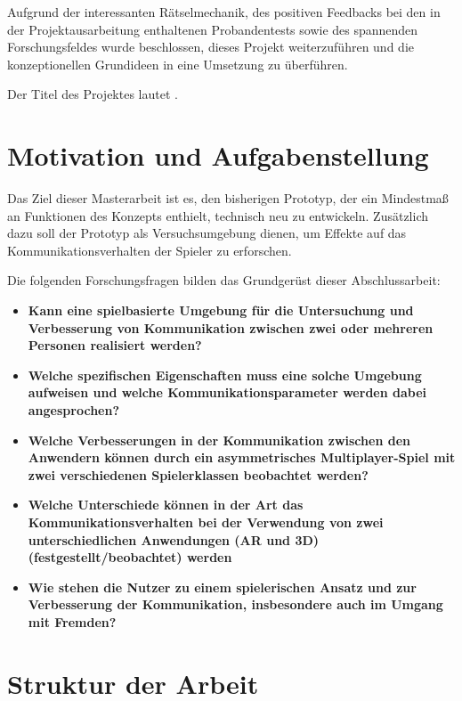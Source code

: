 Aufgrund der interessanten Rätselmechanik, des positiven Feedbacks bei den in der Projektausarbeitung enthaltenen Probandentests sowie des spannenden Forschungsfeldes wurde beschlossen, dieses Projekt weiterzuführen und die konzeptionellen Grundideen in eine Umsetzung zu überführen.

Der Titel des Projektes lautet .

\section{Motivation und Aufgabenstellung}
Das Ziel dieser Masterarbeit ist es, den bisherigen Prototyp, der ein Mindestmaß an Funktionen des Konzepts enthielt, technisch neu zu entwickeln. Zusätzlich dazu soll der Prototyp als Versuchsumgebung dienen, um Effekte auf das Kommunikationsverhalten der Spieler zu erforschen. 

Die folgenden Forschungsfragen bilden das Grundgerüst dieser Abschlussarbeit:


\begin{itemize}
    \item \textbf{Kann eine spielbasierte Umgebung für die Untersuchung und Verbesserung von Kommunikation zwischen zwei oder mehreren Personen realisiert werden?}
    \item \textbf{Welche spezifischen Eigenschaften muss eine solche Umgebung aufweisen und welche Kommunikationsparameter werden dabei angesprochen?}
    \item \textbf{Welche Verbesserungen in der Kommunikation zwischen den Anwendern können durch ein asymmetrisches Multiplayer-Spiel mit zwei verschiedenen Spielerklassen beobachtet werden?}
    \item \textbf{Welche Unterschiede können in der Art das Kommunikationsverhalten bei der Verwendung von zwei unterschiedlichen Anwendungen (AR und 3D) (festgestellt/beobachtet) werden}
    \item \textbf{Wie stehen die Nutzer zu einem spielerischen Ansatz und zur Verbesserung der Kommunikation, insbesondere auch im Umgang mit Fremden?}
\end{itemize}

\section{Struktur der Arbeit}

